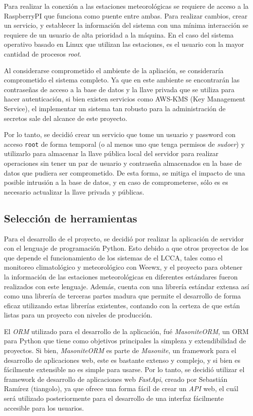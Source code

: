 Para realizar la conexión a las estaciones meteorológicas se requiere de acceso a la RaspberryPI que funciona como puente entre ambas. Para realizar cambios, crear un servicio, y establecer la información del sistema con una mínima interacción se requiere de un usuario de alta prioridad a la máquina. En el caso del sistema operativo basado en Linux que utilizan las estaciones, es el usuario con la mayor cantidad de procesos \emph{root}.

Al considerarse comprometido el ambiente de la apliación, se consideraría comprometido el sistema completo. Ya que en este ambiente se encontrarán las contraseñas de acceso a la base de datos y la llave privada que se utiliza para hacer autenticación, si bien existen servicios como AWS-KMS (Key Management Service), el implementar un sistema tan robusto para la administración de secretos sale del alcance de este proyecto.

Por lo tanto, se decidió crear un servicio que tome un usuario y password con acceso \texttt{root} de forma temporal (o al menos uno que tenga permisos de \emph{sudoer}) y utilizarlo para almacenar la llave pública local del servidor para realizar operaciones sin tener un par de usuario y contraseña almacenados en la base de datos que pudiera ser comprometido. De esta forma, se mitiga el impacto de una posible intrusión a la base de datos, y en caso de comprometerse, sólo es es necesario actualizar la llave privada y públicas.

\subsection{Selección de herramientas}

Para el desarrollo de el proyecto, se decidió por realizar la aplicación de servidor con el lenguaje de programación Python. Esto debido a que otros proyectos de los que depende el funcionamiento de los sistemas de el LCCA, tales como el monitoreo climatológico y meteorológico con Weewx, y el proyecto para obtener la información de las estaciones meteorológicas en diferentes estándares \cite{jimenez2019management} fueron realizados con este lenguaje. Además, cuenta con una librería estándar extensa así como una librería de terceras partes madura que permite el desarrollo de forma eficaz utilizando estas librerías existentes, contando con la certeza de que están listas para un proyecto con niveles de producción.

El \textit{ORM} utilizado para el desarrollo de la aplicación, fué \textit{MasoniteORM}, un ORM para Python que tiene como objetivos principales la simpleza y extendibilidad de proyectos. Si bien, \textit{MasoniteORM} es parte de \textit{Masonite}, un framework para el desarrollo de aplicaciones web, este es bastante extenso y complejo, y si bien es fácilmente extensible no es simple para usarse. Por lo tanto, se decidió utilizar el framework de desarrollo de aplicaciones web \textit{FastApi}, creado por Sebastián Ramírez (tiangolo), ya que ofrece una forma fácil de crear un \textit{API} web, el cuál será utilizado posteriormente para el desarrollo de una interfaz fácilmente accesible para los usuarios.

